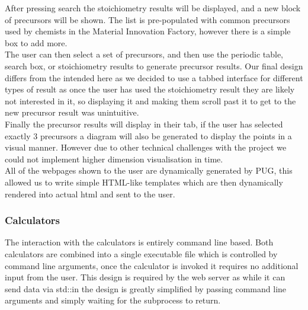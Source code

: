 After pressing search the stoichiometry results will be displayed, and a new block of precursors will be shown. The list is pre-populated with common precursors used by chemists in the Material Innovation Factory, however there is a simple box to add more. \\

The user can then select a set of precursors, and then use the periodic table, search box, or stoichiometry results to generate precursor results. Our final design differs from the intended here as we decided to use a tabbed interface for different types of result as once the user has used the stoichiometry result they are likely not interested in it, so displaying it and making them scroll past it to get to the new precursor result was unintuitive. \\

Finally the precursor results will display in their tab, if the user has selected exactly 3 precursors a diagram will also be generated to display the points in a visual manner. However due to other technical challenges with the project we could not implement higher dimension visualisation in time. \\

All of the webpages shown to the user are dynamically generated by PUG, this allowed us to write simple HTML-like templates which are then dynamically rendered into actual html and sent to the user.

\subsubsection{Calculators}
The interaction with the calculators is entirely command line based. Both calculators are combined into a single executable file which is controlled by command line arguments, once the calculator is invoked it requires no additional input from the user. This design is required by the web server as while it can send data via std::in the design is greatly simplified by passing command line arguments and simply waiting for the subprocess to return. \\

